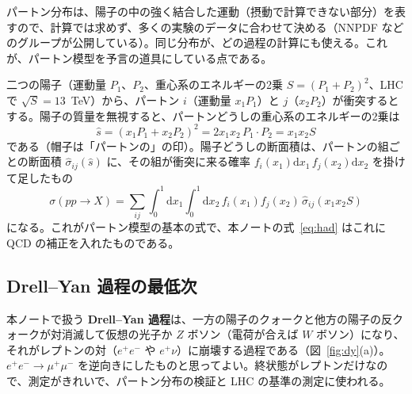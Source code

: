 \documentclass[a4paper,10pt]{ltjsarticle}
\newcommand{\dd}{\mathrm{d}}
\begin{document}
パートン分布は、陽子の中の強く結合した運動（摂動で計算できない部分）を表すので、計算では求めず、多くの実験のデータに合わせて決める（NNPDF などのグループが公開している）。同じ分布が、どの過程の計算にも使える。これが、パートン模型を予言の道具にしている点である。

二つの陽子（運動量 $P_1$、$P_2$、重心系のエネルギーの2乗 $S=(P_1+P_2)^2$、LHC で $\sqrt S=13$~TeV）から、パートン $i$（運動量 $x_1P_1$）と $j$（$x_2P_2$）が衝突するとする。陽子の質量を無視すると、パートンどうしの重心系のエネルギーの2乗は
\[
\hat s=(x_1P_1+x_2P_2)^2=2x_1x_2\,P_1\cdot P_2=x_1x_2S
\]
である（帽子は「パートンの」の印）。陽子どうしの断面積は、パートンの組ごとの断面積 $\hat\sigma_{ij}(\hat s)$ に、その組が衝突に来る確率 $f_i(x_1)\dd x_1\,f_j(x_2)\dd x_2$ を掛けて足したもの
\begin{equation}
\sigma(pp\to X)=\sum_{ij}\int_0^1\dd x_1\int_0^1\dd x_2\,f_i(x_1)f_j(x_2)\,\hat\sigma_{ij}(x_1x_2S)
\label{eq:partonmodel}
\end{equation}
になる。これがパートン模型の基本の式で、本ノートの式~\eqref{eq:had} はこれに QCD の補正を入れたものである。

\subsection{Drell--Yan 過程の最低次}\label{sec:dylo}

本ノートで扱う \textbf{Drell--Yan 過程}は、一方の陽子のクォークと他方の陽子の反クォークが対消滅して仮想の光子か $Z$ ボソン（電荷が合えば $W$ ボソン）になり、それがレプトンの対（$e^+e^-$ や $e^+\nu$）に崩壊する過程である（図~\ref{fig:dy}(a)）。$e^+e^-\to\mu^+\mu^-$ を逆向きにしたものと思ってよい。終状態がレプトンだけなので、測定がきれいで、パートン分布の検証と LHC の基準の測定に使われる。
\end{document}
